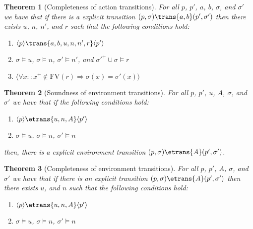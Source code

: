 \documentclass[submission,copyright,creativecommons,sharealike]{eptcs}
\newcommand{\sstate}[1]{\ensuremath{\langle #1 \rangle}}
\newcommand{\satrans}[1]{\ensuremath{\trans{#1}}}
\newcommand{\setrans}[1]{\ensuremath{\etrans{#1}}}
\newtheorem{theorem}{Theorem}
\begin{document}
\begin{theorem}[Completeness of action transitions]
  \label{theo:completeness-atrans}
  For all $p$, $p'$, $a$, $b$, $\sigma$, and $\sigma'$ we have
  that if there is a explicit transition
  $(p, \sigma) \trans{a, b} (p', \sigma')$
then there exists $u$, $n$, $n'$, and $r$ such that the following
  conditions hold:
  \begin{enumerate}
  \item $\sstate{p} \satrans{a,
      b, u, n, n', r} \sstate{p'}$
  \item $\sigma \models u$, $\sigma \models n$,
    $\sigma' \models n'$, and $\sigma'^+ \cup \sigma \models r$
  \item $\langle \forall x :: x^+ \notin \textrm{FV}(r) \Rightarrow
   \sigma (x) = \sigma'(x) \rangle$
  \end{enumerate}
\end{theorem}

\begin{theorem}[Soundness of environment transitions]
  \label{theo:soundness-etrans}
  For all $p$, $p'$, $u$, $A$,
  $\sigma$, and $\sigma'$ we have that if the following conditions
  hold:
  \begin{enumerate}
  \item $\sstate{p} \setrans{u, n, A} \sstate{p'}$
  \item $\sigma \models u$, $\sigma \models n$, $\sigma' \models n$
  \end{enumerate}
  then, there is a explicit environment transition
  $(p, \sigma) \etrans{A} (p', \sigma')$.
\end{theorem}

\begin{theorem}[Completeness of environment transitions]
  \label{theo:completeness-etrans}
  For all $p$, $p'$, $A$, $\sigma$, and $\sigma'$ we have that if
  there is an explicit transition $(p, \sigma) \etrans{A} (p',
  \sigma')$ then there exists $u$, and $n$ such that the following
  conditions hold:
  \begin{enumerate}
  \item $\sstate{p} \setrans{u, n, A} \sstate{p'}$
  \item $\sigma \models u$, $\sigma \models n$, $\sigma' \models n$
  \end{enumerate}
\end{theorem}
\end{document}
